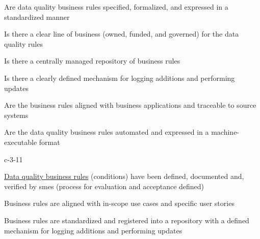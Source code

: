 %
%



\begin{maturity-dimensions}

  \item Are data quality business rules specified, formalized, and expressed in a standardized manner
  \item Is there a clear line of business  (owned, funded, and governed) for the
        data quality rules
  \item Is there a centrally managed repository of business rules
  \item Is there a clearly defined mechanism for logging additions and performing updates
  \item Are the business rules aligned with business applications and traceable to source systems
  \item Are the data quality business rules automated and expressed in a machine-executable format

\end{maturity-dimensions}

\ekgmmCapabilitySectionLevelsOneFive

\begin{level-assessment}{c-3-1}{1}

  \item \hyperref[sec:ekg-maturity-data-quality-business-rules]{Data quality business rules} (conditions) have been defined,
        documented and, verified by \glspl{sme} (process for evaluation and acceptance defined)
  \item Business rules are aligned with in-scope use cases and specific user stories
  \item Business rules are standardized and registered into a repository with a defined mechanism for logging
        additions and performing updates

\end{level-assessment}

